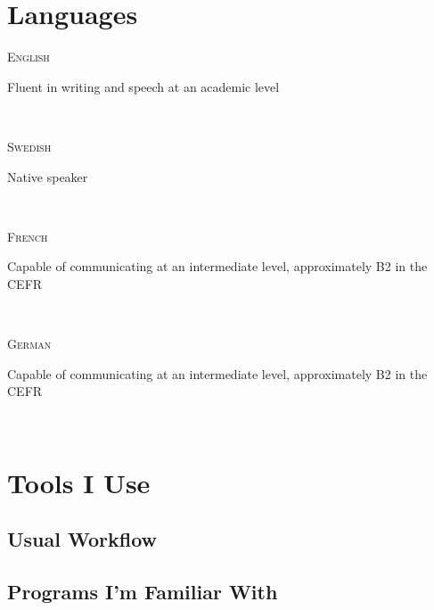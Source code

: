 \documentclass[letterpaper,
		10pt]{article}
\let\oldhref\href
\renewcommand{\href}[3][blue]{\oldhref{#2}{\color{#1}{#3}}}
\newcommand{\entry}[4]{
\ifthenelse{\isempty{#3}}
{\slimentry{#1}{#2}}{

\begin{minipage}[t]{.15\linewidth}
\hfill \textsc{#1}
\end{minipage}
\hfill\vline\hfill
\begin{minipage}[t]{.80\linewidth}
{\bf#2}\\\textit{#3} \footnotesize{#4}
\end{minipage}\\
\vspace{.2cm}
}}
\newcommand{\slimentry}[2]{
\begin{minipage}[t]{.15\linewidth}
\hfill \textsc{#1}
\end{minipage}
\hfill\vline\hfill
\begin{minipage}[t]{.80\linewidth}
#2
\end{minipage}\\
\vspace{.25cm}
}
\newcommand{\sentry}[2]{
\begin{minipage}[t]{.15\linewidth}
\hfill \textsc{#1}
\end{minipage}
\hfill\vline\hfill
\begin{minipage}[t]{.80\linewidth}
#2
\end{minipage}\\
\vspace{-.15cm}
}%
\begin{document}
\section{Languages}

\sentry{English}{Fluent in writing and speech at an academic level}

\sentry{Swedish}{Native speaker}

\sentry{French}{Capable of communicating at an intermediate level, approximately B2 in the CEFR}

\sentry{German}{Capable of communicating at an intermediate level, approximately B2 in the CEFR}



\section{Tools I Use}


\subsection{Usual Workflow}


\subsection{Programs I'm Familiar With}

\end{document}

